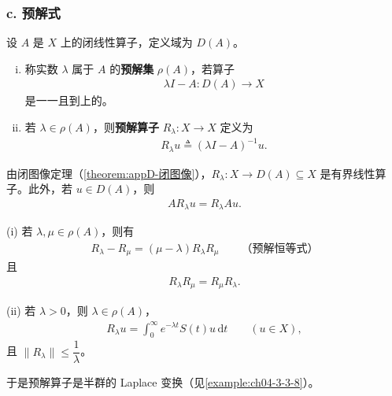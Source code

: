 \documentclass[../../main.tex]{subfiles}
\begin{document}
\subsubsection*{c. 预解式}

设 $A$ 是 $X$ 上的闭线性算子，定义域为 $D(A)$。

\begin{definition}\label{definition:ch07-4-预解集与预解式}
\begin{enumerate}[(i)]
\item 称实数 $\lambda$ 属于 $A$ 的\textbf{预解集} $\rho(A)$，若算子
\begin{align*}
\lambda I-A:D(A)\to X
\end{align*}
是一一且到上的。
\item 若 $\lambda\in\rho(A)$，则\textbf{预解算子} $R_\lambda:X\to X$ 定义为
\begin{align*}
R_\lambda u\triangleq (\lambda I-A)^{-1}u.
\end{align*}
\end{enumerate}
\end{definition}

由闭图像定理（\cref{theorem:appD-闭图像}），$R_\lambda:X\to D(A)\subseteq X$ 是有界线性算子。此外，若 $u\in D(A)$，则
\begin{align*}
AR_\lambda u=R_\lambda Au.
\end{align*}

\begin{theorem}[预解算子的性质。]\label{theorem:ch07-4-预解算子的性质}

(i) 若 $\lambda,\mu\in\rho(A)$，则有
\begin{align}
R_\lambda-R_\mu=(\mu-\lambda)R_\lambda R_\mu\qquad\text{（预解恒等式）}\label{align:ch07-4-eq12}
\end{align}
且
\begin{align}
R_\lambda R_\mu=R_\mu R_\lambda.\label{align:ch07-4-eq13}
\end{align}

(ii) 若 $\lambda>0$，则 $\lambda\in\rho(A)$，
\begin{align}
R_\lambda u=\int_0^\infty e^{-\lambda t}S(t)u\,\mathrm{d}t\qquad (u\in X),\label{align:ch07-4-eq14}
\end{align}
且 $\|R_\lambda\|\leqslant\dfrac{1}{\lambda}$。
\end{theorem}

于是预解算子是半群的 Laplace 变换（见\cref{example:ch04-3-3-8}）。
\end{document}
